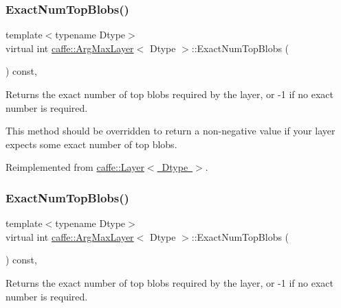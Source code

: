 \subsubsection{\texorpdfstring{Exact\+Num\+Top\+Blobs()}{ExactNumTopBlobs()}\hspace{0.1cm}{\footnotesize\ttfamily [1/2]}}
{\footnotesize\ttfamily template$<$typename Dtype$>$ \\
virtual int \mbox{\hyperlink{classcaffe_1_1_arg_max_layer}{caffe\+::\+Arg\+Max\+Layer}}$<$ Dtype $>$\+::Exact\+Num\+Top\+Blobs (\begin{DoxyParamCaption}{ }\end{DoxyParamCaption}) const\hspace{0.3cm}{\ttfamily [inline]}, {\ttfamily [virtual]}}



Returns the exact number of top blobs required by the layer, or -\/1 if no exact number is required. 

This method should be overridden to return a non-\/negative value if your layer expects some exact number of top blobs. 

Reimplemented from \mbox{\hyperlink{classcaffe_1_1_layer_a64e2ca72c719e4b2f1f9216ccfb0d37f}{caffe\+::\+Layer$<$ Dtype $>$}}.

\mbox{\label{classcaffe_1_1_arg_max_layer_a45e9c6e7b572b915be8731fcb6403695}} 
\subsubsection{\texorpdfstring{Exact\+Num\+Top\+Blobs()}{ExactNumTopBlobs()}\hspace{0.1cm}{\footnotesize\ttfamily [2/2]}}
{\footnotesize\ttfamily template$<$typename Dtype$>$ \\
virtual int \mbox{\hyperlink{classcaffe_1_1_arg_max_layer}{caffe\+::\+Arg\+Max\+Layer}}$<$ Dtype $>$\+::Exact\+Num\+Top\+Blobs (\begin{DoxyParamCaption}{ }\end{DoxyParamCaption}) const\hspace{0.3cm}{\ttfamily [inline]}, {\ttfamily [virtual]}}



Returns the exact number of top blobs required by the layer, or -\/1 if no exact number is required. 

